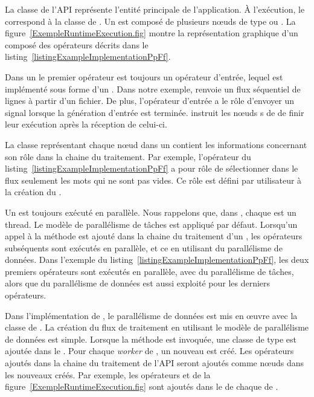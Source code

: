 La classe  de l'API repr\'esente l'entit\'e principale de l'application. \`A l'ex\'ecution, le  correspond \`a la classe  de . Un  est compos\'e de plusieurs nœuds de type  ou . La figure~\ref{ExempleRuntimeExecution.fig} montre la repr\'esentation graphique d'un  compos\'e des op\'erateurs d\'ecrits dans le listing~\ref{listingExampleImplementationPpFf}.
 
Dans un  le premier op\'erateur est toujours un op\'erateur d'entr\'ee, lequel est impl\'ement\'e sous forme d'un . Dans notre exemple,  renvoie un flux s\'equentiel de lignes \`a partir d'un fichier. De plus, l'op\'erateur d'entr\'ee a le r\^ole d'envoyer un signal  lorsque la g\'en\'eration d'entr\'ee est termin\'ee.  instruit les nœuds s de  de finir leur ex\'ecution apr\`es la r\'eception de celui-ci.

La classe repr\'esentant chaque nœud dans un  contient les informations concernant son r\^ole dans la chaine du traitement. Par exemple, l'op\'erateur  du listing~\ref{listingExampleImplementationPpFf} a pour r\^ole de s\'electionner dans le flux seulement les mots qui ne sont pas vides. Ce r\^ole est d\'efini par utilisateur \`a la cr\'eation du . 


Un  est toujours ex\'ecut\'e en parall\`ele. Nous rappelons que, dans , chaque  est un thread. Le mod\`ele de parall\'elisme de t\^aches est appliqu\'e par d\'efaut. Lorsqu'un appel \`a la m\'ethode  est ajout\'e dans la chaine du traitement d'un , les op\'erateurs subs\'equents sont ex\'ecut\'es en parall\`ele, et ce en utilisant du parall\'elisme de donn\'ees. Dans l'exemple du listing~\ref{listingExampleImplementationPpFf}, les deux premiers op\'erateurs sont ex\'ecut\'es en parall\`ele, avec du parall\'elisme de t\^aches, alors que du  parall\'elisme de donn\'ees est aussi exploit\'e pour les derniers op\'erateurs. 

Dans l'impl\'ementation de , le parall\'elisme de donn\'ees est mis en œuvre avec la classe  de . La cr\'eation du flux de traitement en utilisant le mod\`ele de parall\'elisme de donn\'ees est simple. Lorsque la m\'ethode  est invoqu\'ee, une classe de type  est ajout\'ee dans le . Pour chaque \emph{worker} de , un nouveau  est cr\'e\'e. Les op\'erateurs ajout\'es dans la chaine du traitement de l'API seront ajout\'es comme nœuds dans les nouveaux  cr\'e\'es. Par exemple, les op\'erateurs  et  de la figure~\ref{ExempleRuntimeExecution.fig} sont ajout\'es dans le  de chaque  de . 


